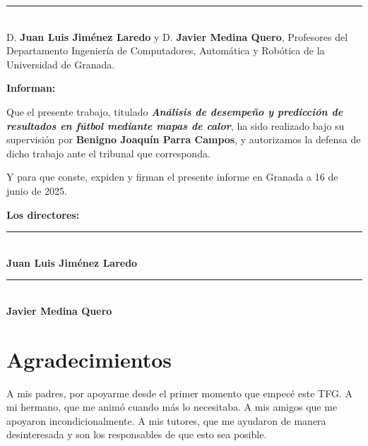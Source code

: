 \thispagestyle{empty}

\noindent\rule[-1ex]{\textwidth}{2pt}\\[4.5ex]

D. \textbf{Juan Luis Jiménez Laredo} y D. \textbf{Javier Medina Quero}, Profesores del Departamento Ingeniería de Computadores, Automática y Robótica de la Universidad de Granada.



\vspace{0.5cm}

\textbf{Informan:}

\vspace{0.5cm}

Que el presente trabajo, titulado \textit{\textbf{Análisis de desempeño y predicción de resultados en fútbol mediante mapas de calor}},
ha sido realizado bajo su supervisión por \textbf{Benigno Joaquín Parra Campos}, y autorizamos la defensa de dicho trabajo ante el tribunal
que corresponda.

\vspace{0.5cm}

Y para que conste, expiden y firman el presente informe en Granada a 16 de junio de 2025.

\vspace{1cm}

\textbf{Los directores:}

\vspace{5cm}

\begin{center}
  \begin{minipage}[t]{0.45\textwidth}
    \centering
    \rule{6cm}{0.4pt}\\[1ex]
    \textbf{Juan Luis Jiménez Laredo}
  \end{minipage}%
  \hfill
  \begin{minipage}[t]{0.45\textwidth}
    \centering
    \rule{6cm}{0.4pt}\\[1ex]
    \textbf{Javier Medina Quero}
  \end{minipage}
\end{center}
\chapter*{Agradecimientos}
A mis padres, por apoyarme desde el primer momento que empecé este TFG. A mi hermano, que me animó cuando más lo necesitaba. A mis amigos que me apoyaron incondicionalmente. A mis tutores, que me ayudaron de manera desinteresada y son los responsables de que esto sea posible.




